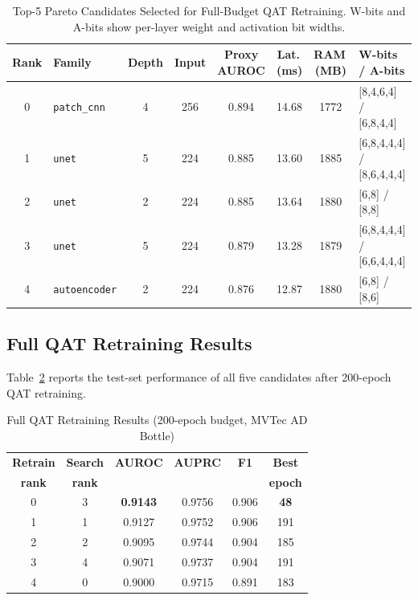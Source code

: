 \documentclass[journal]{IEEEtran}
\begin{document}
\begin{table}[!t]
\caption{Top-5 Pareto Candidates Selected for Full-Budget QAT Retraining.
  W-bits and A-bits show per-layer weight and activation bit widths.}
\label{tab:top5}
\centering
\small
\begin{tabular}{@{}clcccccl@{}}
\toprule
\textbf{Rank} & \textbf{Family} & \textbf{Depth} & \textbf{Input} &
\textbf{Proxy AUROC} & \textbf{Lat.\,(ms)} & \textbf{RAM\,(MB)} &
\textbf{W-bits / A-bits} \\
\midrule
0 & \texttt{patch\_cnn} & 4 & 256 & 0.894 & 14.68 & 1772 & [8,4,6,4] / [6,8,4,4] \\
1 & \texttt{unet}       & 5 & 224 & 0.885 & 13.60 & 1885 & [6,8,4,4,4] / [8,6,4,4,4] \\
2 & \texttt{unet}       & 2 & 224 & 0.885 & 13.64 & 1880 & [6,8] / [8,8] \\
3 & \texttt{unet}       & 5 & 224 & 0.879 & 13.28 & 1879 & [6,8,4,4,4] / [6,6,4,4,4] \\
4 & \texttt{autoencoder}& 2 & 224 & 0.876 & 12.87 & 1880 & [6,8] / [8,6] \\
\bottomrule
\end{tabular}
\end{table}

\subsection{Full QAT Retraining Results}
\label{sec:retrain_results}

Table~\ref{tab:retrain} reports the test-set performance of all five candidates
after 200-epoch QAT retraining.

\begin{table}[!t]
\caption{Full QAT Retraining Results (200-epoch budget, MVTec AD Bottle)}
\label{tab:retrain}
\centering
\begin{tabular}{@{}cccccc@{}}
\toprule
\textbf{Retrain} & \textbf{Search} & \textbf{AUROC} & \textbf{AUPRC} &
\textbf{F1} & \textbf{Best} \\
\textbf{rank} & \textbf{rank} & & & & \textbf{epoch} \\
\midrule
0 & 3 & \textbf{0.9143} & 0.9756 & 0.906 & \textbf{48} \\
1 & 1 & 0.9127           & 0.9752 & 0.906 & 191 \\
2 & 2 & 0.9095           & 0.9744 & 0.904 & 185 \\
3 & 4 & 0.9071           & 0.9737 & 0.904 & 191 \\
4 & 0 & 0.9000           & 0.9715 & 0.891 & 183 \\
\bottomrule
\end{tabular}
\end{table}
\end{document}
